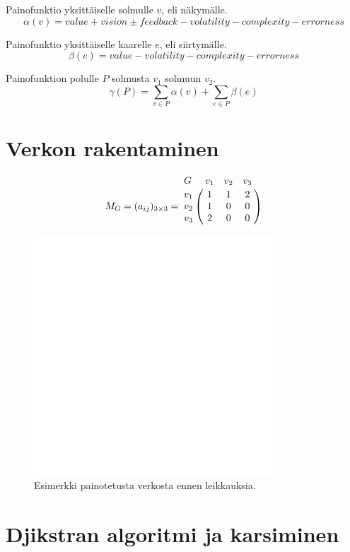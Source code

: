   Painofunktio yksittäiselle solmulle \(v\), eli näkymälle.
  \[\alpha(v) = value + vision \pm feedback - volatility - complexity - errorness\]

  Painofunktio yksittäiselle kaarelle \(e\), eli siirtymälle.
  \[\beta(e) = value - volatility - complexity - errorness\]

  Painofunktion polulle \(P\) solmusta \(v_1\) solmuun \(v_2\).
  \[\gamma(P) = \sum_{v \in P} \alpha(v) + \sum_{e \in P} \beta(e)\]

\section{Verkon rakentaminen} \label{ch:10_verkon_rakentaminen}


  \[
    M_G = (a_{ij})_{3\times3} =
    \bordermatrix{
      G & v_1 & v_2 & v_3 \cr
      v_1 & 1 & 1 & 2 \cr
      v_2 & 1 & 0 & 0 \cr
      v_3 & 2 & 0 & 0 \cr
    }
  \]

  \begin{figure}[H]
    \centering
    \includegraphics[width=0.8\textwidth]{assets/painotetun-verkon-esimerkki-ennen.png}
    \caption{Esimerkki painotetusta verkosta ennen leikkauksia.}
    \label{fig:painotetun-verkon-esimerkki-ennen}
  \end{figure}

\section{Djikstran algoritmi ja karsiminen} \label{ch:10_djikstran_algoritmi_ja_karsiminen}

